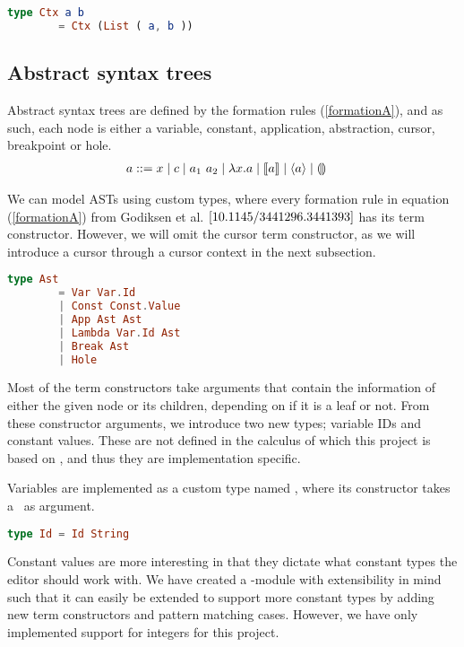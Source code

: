 \begin{lstlisting}[language=elm,%
                   label={listing:ctx},%
                   gobble=4,%
                   caption={Our own version of \elm{Dict k v}.},%
                   ]
    type Ctx a b
        = Ctx (List ( a, b ))
\end{lstlisting}

\subsection{Abstract syntax trees}
Abstract syntax trees are defined by the formation rules (\ref{formationA}),
and as such, each node is either a variable, constant, application,
abstraction, cursor, breakpoint or hole.
\begin{align}
    a &::= x \mid c \mid a_1~a_2 \mid \lambda x.a \mid \llbracket a \rrbracket \mid \langle a \rangle \mid \llparenthesis\rrparenthesis\label{formationA}
\end{align}

We can model ASTs using custom types, where every formation rule
in equation (\ref{formationA}) from Godiksen et al. $\pepm$ has its term
constructor. However, we will omit the cursor term constructor, as we will
introduce a cursor through a cursor context in the next subsection.

\begin{lstlisting}[language=elm,%
                   label={ast-definition},%
                   gobble=4,%
                   caption={Formation rules (\ref{formationA}) modeled in Elm},%
                   ]
    type Ast
        = Var Var.Id
        | Const Const.Value
        | App Ast Ast
        | Lambda Var.Id Ast
        | Break Ast
        | Hole
\end{lstlisting}

Most of the term constructors take arguments that contain the information of
either the given node or its children, depending on if it is a leaf or not. From
these constructor arguments, we introduce two new types; variable IDs and
constant values. These are not defined in the calculus of which this project is
based on \pepm, and thus they are implementation specific.

Variables are implemented as a custom type named , where its constructor takes a ~as argument.

\begin{lstlisting}[language=elm,%
                   gobble=0,%
                   ]
type Id = Id String
\end{lstlisting}

Constant values are more interesting in that they dictate what constant types
the editor should work with. We have created a -module with
extensibility in mind such that it can easily be extended to support more
constant types by adding new term constructors and pattern matching cases.
However, we have only implemented support for integers for this project.

